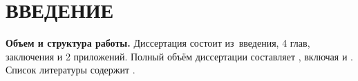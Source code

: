 \chapter*{ВВЕДЕНИЕ}                         %

\newcommand{\actuality}{}
\newcommand{\progress}{}
\newcommand{\aim}{{\textbf\aimTXT}}
\newcommand{\tasks}{\textbf{\tasksTXT}}
\newcommand{\novelty}{\textbf{\noveltyTXT}}
\newcommand{\influence}{\textbf{\influenceTXT}}
\newcommand{\methods}{\textbf{\methodsTXT}}
\newcommand{\defpositions}{\textbf{\defpositionsTXT}}
\newcommand{\reliability}{\textbf{\reliabilityTXT}}
\newcommand{\probation}{\textbf{\probationTXT}}
\newcommand{\contribution}{\textbf{\contributionTXT}}
\newcommand{\publications}{\textbf{\publicationsTXT}}



\textbf{Объем и структура работы.} Диссертация состоит из~введения, 4 глав, заключения и 2 приложений.
%
Полный объём диссертации составляет
, включая
 и
.
Список литературы содержит
.

 